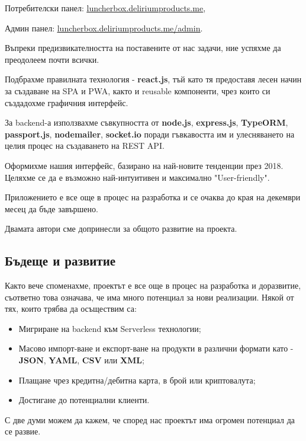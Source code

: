 \documentclass[a4paper]{article}
\begin{document}
\begin{Large}
Потребителски панел: \href{https://luncherbox.deliriumproducts.me}{\underline{luncherbox.deliriumproducts.me}}, 

Админ панел: \href{https://luncherbox.deliriumproducts.me/admin}{\underline{luncherbox.deliriumproducts.me/admin}}. 
 
Въпреки предизвикателността на поставените от нас задачи, ние успяхме да преодолеем почти всички. 

Подбрахме правилната технология - \textbf{react.js}, тъй като тя предоставя лесен начин за създаване на SPA и PWA, както и reusable компоненти, чрез които си създадохме графичния интерфейс. 

За backend-а използвахме съвкупността от  \textbf{node.js}, \textbf{express.js}, \textbf{TypeORM}, \textbf{passport.js}, \textbf{nodemailer}, \textbf{socket.io} поради гъвкавостта им и улесняването на целия процес на създаването на REST API. 

Оформихме нашия интерфейс, базирано на най-новите тенденции през 2018. Целяхме се да е възможно най-интуитивен и максимално "User-friendly".

Приложението е все още в процес на разработка и се очаква до края на декември месец да бъде завършено. 

Двамата автори сме допринесли за общото развитие на проекта. 

\subsection{Бъдеще и развитие}

Както вече споменахме, проектът е все още в процес на разработка и доразвитие, съответно това означава, че има много потенциал за нови реализации. Някой от тях, които трябва да осъществим са:

\begin{itemize}
\item Мигриране на backend към Serverless технологии; \unsure
\item Масово импорт-ване и експорт-ване на продукти в различни формати като - \textbf{JSON}, \textbf{YAML}, \textbf{CSV} или \textbf{XML};
\item Плащане чрез кредитна/дебитна карта, в брой или криптовалута;
\item Достигане до потенциални клиенти.
\end{itemize}

С две думи можем да кажем, че според нас проектът има огромен
потенциал да се развие.

\end{Large}
\end{document}
